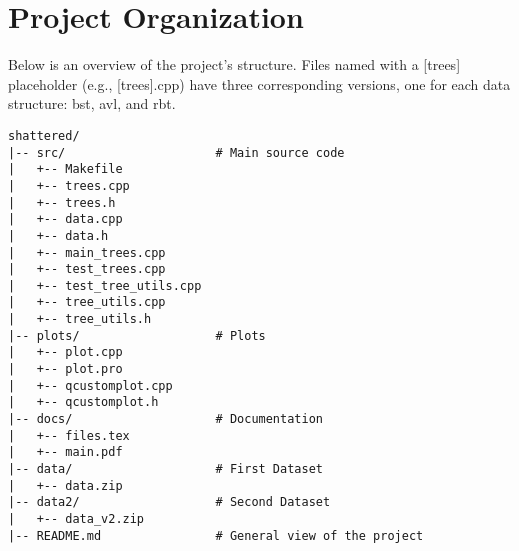 \section{Project Organization}

Below is an overview of the project's structure. Files named with a [trees] placeholder (e.g., [trees].cpp) have three corresponding versions, one for each data structure: bst, avl, and rbt.


\begin{verbatim}
shattered/
|-- src/                     # Main source code
|   +-- Makefile          
|   +-- trees.cpp          
|   +-- trees.h 
|   +-- data.cpp
|   +-- data.h 
|   +-- main_trees.cpp 
|   +-- test_trees.cpp 
|   +-- test_tree_utils.cpp 
|   +-- tree_utils.cpp 
|   +-- tree_utils.h 
|-- plots/                   # Plots
|   +-- plot.cpp
|   +-- plot.pro
|   +-- qcustomplot.cpp
|   +-- qcustomplot.h
|-- docs/                    # Documentation
|   +-- files.tex
|   +-- main.pdf
|-- data/                    # First Dataset
|   +-- data.zip
|-- data2/                   # Second Dataset
|   +-- data_v2.zip                        
|-- README.md                # General view of the project
\end{verbatim}